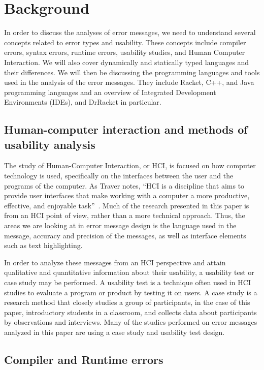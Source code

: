 \documentclass{sig-alternate}
\begin{document}
\section{Background}\label{sec:background}
In order to discuss the analyses of error messages, we need to understand several concepts related to error types and usability.
These concepts include compiler errors, syntax errors, runtime errors, usability studies, and Human Computer Interaction.
We will also cover dynamically and statically typed languages and their differences.
We will then be discussing the programming languages and tools used in the analysis of the error messages.
They include Racket, C++, and Java programming languages and an overview of Integrated Development Environments (IDEs), and DrRacket in particular. 


\subsection{Human-computer interaction and methods of usability analysis}\label{subsec:hci}

The study of Human-Computer Interaction, or HCI, is focused on how computer technology is used, specifically on the interfaces between the user and the programs of the computer.
As Traver notes, ``HCI is a discipline that aims to provide user interfaces that make working with a computer a more productive, effective, and enjoyable task''~\cite{Traver:2010}.
Much of the research presented in this paper is from an HCI point of view, rather than a more technical approach.
Thus, the areas we are looking at in error message design is the language used in the message, accuracy and precision of the messages, as well as interface elements such as text highlighting.

In order to analyze these messages from an HCI perspective and attain qualitative and quantitative information about their usability, a usability test or case study may be performed.
A usability test is a technique often used in HCI studies to evaluate a program or product by testing it on users.
A case study is a research method that closely studies a group of participants, in the case of this paper, introductory students in a classroom, and collects data about participants by observations and interviews.
Many of the studies performed on error messages analyzed in this paper are using a case study and usability test design. 

\subsection{Compiler and Runtime errors}\label{subsec:error types}
\end{document}
